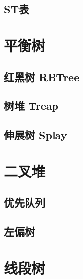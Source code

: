 	\subsection{ST表}\small


\section{平衡树}\small


	\subsection{红黑树 RBTree}\small


	\subsection{树堆 Treap}\small


	\subsection{伸展树 Splay}\small


\section{二叉堆}\small


	\subsection{优先队列}\small


	\subsection{左偏树}\small


\section{线段树}\small


